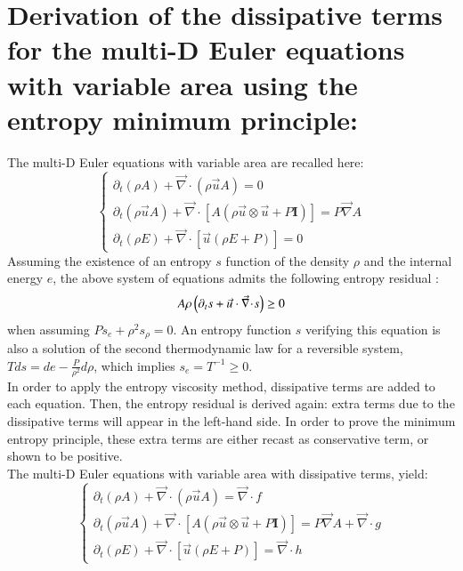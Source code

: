 \documentclass[preprint,10pt]{elsarticle}
\renewcommand{\div}{\vec{\nabla}\! \cdot \!}
\newcommand{\grad}{\vec{\nabla}}
\begin{document}
\section{Derivation of the dissipative terms for the multi-D Euler equations with variable area using the entropy minimum principle:} \label{app:diss_terms}
The multi-D Euler equations with variable area are recalled here:
\begin{equation}
\label{app:euler_variable_A}
\left\{ 
\begin{array}{lll}
\partial_t \left( \rho A \right) + \div \left( \rho \vec{u} A \right) = 0 \\
\partial_t \left( \rho \vec{u} A \right) + \div \left[A\left( \rho \vec{u} \otimes \vec{u} + P \mathbf{I} \right) \right] = P \grad A \\
\partial_t \left( \rho E \right) + \div \left[ \vec{u} \left( \rho E + P \right) \right] = 0
\end{array}
\right. \nonumber
\end{equation}
Assuming the existence of an entropy $s$ function of the density $\rho$ and the internal energy $e$, the above system of equations admits the following entropy residual \cite{Toro}:
\begin{equation}
A \rho \left( \partial_t s + \vec{u} \cdot \div s \right) \geq 0 \nonumber \\
\end{equation}
when assuming $Ps_e + \rho^2 s_{\rho} =0$. An entropy function $s$ verifying this equation is also a solution of the second thermodynamic law for a reversible system, $T ds = de - \frac{P}{\rho^2} d \rho$, which implies $s_e = T^{-1} \geq 0$. \\
In order to apply the entropy viscosity method, dissipative terms are added to each equation. Then, the entropy residual is derived again: extra terms due to the dissipative terms will appear in the left-hand side. In order to prove the minimum entropy principle, these extra terms are either recast as conservative term, or shown to be positive. \\ 
The multi-D Euler equations with variable area with dissipative terms, yield:
\begin{equation}
\label{app:euler_variable_A_diss}
\left\{ 
\begin{array}{lll}
\partial_t \left( \rho A \right) + \div \left( \rho \vec{u} A \right) = \div f \\
\partial_t \left( \rho \vec{u} A \right) + \div \left[A\left( \rho \vec{u} \otimes \vec{u} + P \mathbf{I} \right) \right] = P \grad A + \div g \\
\partial_t \left( \rho E \right) + \div \left[ \vec{u} \left( \rho E + P \right) \right] = \div h
\end{array}
\right. 
\end{equation}
\end{document}
